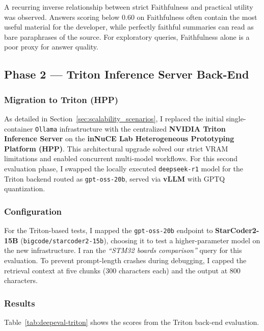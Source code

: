 A recurring inverse relationship between strict Faithfulness and practical utility was observed. Answers scoring below 0.60 on Faithfulness often contain the most useful material for the developer, while perfectly faithful summaries can read as bare paraphrases of the source. For exploratory queries, Faithfulness alone is a poor proxy for answer quality.

\subsection{Phase 2 --- Triton Inference Server Back-End}

\subsubsection{Migration to Triton (HPP)}
As detailed in Section~\ref{sec:scalability_scenarios}, I replaced the initial single-container \texttt{Ollama} infrastructure with the centralized \textbf{NVIDIA Triton Inference Server} on the \textbf{inNuCE Lab Heterogeneous Prototyping Platform (HPP)}. This architectural upgrade solved our strict VRAM limitations and enabled concurrent multi-model workflows. For this second evaluation phase, I swapped the locally executed \texttt{deepseek-r1} model for the Triton backend routed as \texttt{gpt-oss-20b}, served via \textbf{vLLM} with GPTQ quantization.

\subsubsection{Configuration}
For the Triton-based tests, I mapped the \texttt{gpt-oss-20b} endpoint to \textbf{StarCoder2-15B} (\texttt{bigcode/starcoder2-15b}), choosing it to test a higher-parameter model on the new infrastructure. I ran the \textit{``STM32 boards comparison''} query for this evaluation. To prevent prompt-length crashes during debugging, I capped the retrieval context at five chunks (300 characters each) and the output at 800 characters.

\subsubsection{Results}
Table~\ref{tab:deepeval-triton} shows the scores from the Triton back-end evaluation.

